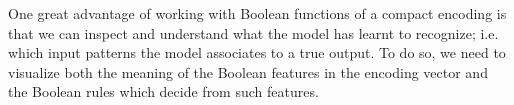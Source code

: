 One great advantage of working with Boolean functions of a compact encoding is
that we can inspect and understand what the model has learnt to recognize;
i.e. which input patterns the model associates to a true output. To do so, we
need to visualize both the meaning of the Boolean features in the encoding
vector and the Boolean rules which decide from such features.

\begin{figure}
	\centering
\end{figure}
